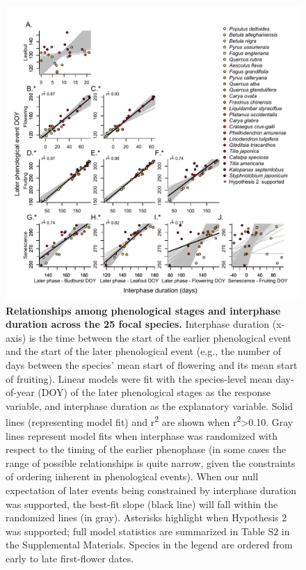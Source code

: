 \documentclass{article}
\begin{document}
\begin{figure}[h]
 \centering
 \includegraphics{../analyses/figures/Hyp2.pdf}
 \caption{\textbf{Relationships among phenological stages and interphase duration across the 25 focal species.} Interphase duration (x-axis) is the time between the start of the earlier phenological event and the start of the later phenological event (e.g., the number of days between the species' mean start of flowering and its mean start of fruiting). Linear models were fit with the species-level mean day-of-year (DOY) of the later phenological stages as the response variable, and interphase duration as the explanatory variable. Solid lines (representing model fit) and r\textsuperscript{2} are shown when r\textsuperscript{2}>0.10. Gray lines represent model fits when interphase was randomized with respect to the timing of the earlier phenophase (in some cases the range of possible relationships is quite narrow, given the constraints of ordering inherent in phenological events). When our null expectation of later events being constrained by interphase duration was supported, the best-fit slope (black line) will fall within the randomized lines (in gray). Asterisks highlight when Hypothesis 2 was supported; full model statistics are summarized in Table S2 in the Supplemental Materials. Species in the legend are ordered from early to late first-flower dates.}
 \label{fig:inter}
 \end{figure}

\end{document}
